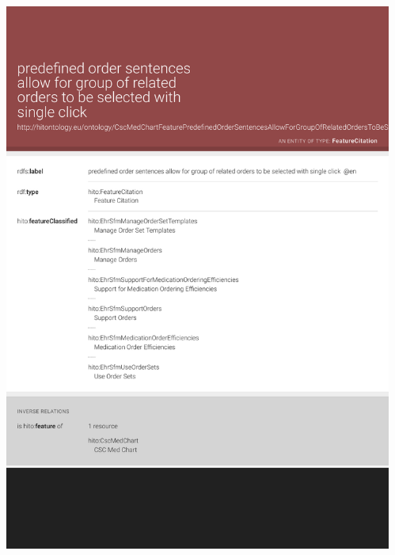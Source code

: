 \documentclass[aspectratio=1610]{beamer}%
\begin{document}
\begin{frame}[plain]
\begin{columns}
 \begin{column}{.55\textwidth}
  \centering\includegraphics[width=1.0\textwidth,height=1.0\textheight,keepaspectratio,trim=0 100 0 0,clip]{cscmedchart-lodview-feature.pdf}
 \end{column}
 \begin{column}{.55\textwidth}

\end{column}
\end{columns}
\end{frame}
\end{document}
